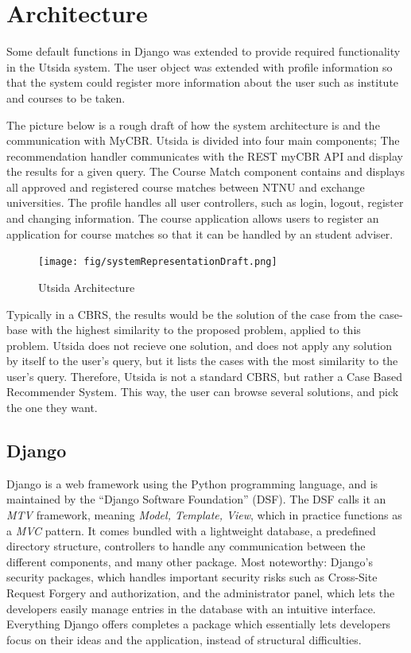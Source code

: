 \section{Architecture}

Some default functions in Django was extended to provide required functionality in the Utsida system. The user object was extended with profile information so that the system could register more information about the user such as institute and courses to be taken. 

The picture below is a rough draft of how the system architecture is and the communication with MyCBR. Utsida is divided into four main components; The recommendation handler communicates with the REST myCBR API and display the results for a given query. The Course Match component contains and displays all approved and registered course matches between NTNU and exchange universities. The profile handles all user controllers, such as login, logout, register and changing information. The course application allows users to register an application for course matches so that it can be handled by an student adviser. 

\begin{figure}[H]
    \centering
    \texttt{[image: fig/systemRepresentationDraft.png]}
    \caption{Utsida Architecture}
    \label{fig:utsida}
\end{figure}

Typically in a CBRS, the results would be the solution of the case from the case-base with the highest similarity to the proposed problem, applied to this problem. Utsida does not recieve one solution, and does not apply any solution by itself to the user's query, but it lists the cases with the most similarity to the user's query. Therefore, Utsida is not a standard CBRS, but rather a Case Based Recommender System. This way, the user can browse several solutions, and pick the one they want.

\subsection{Django}
Django\cite{djangodocs} is a web framework using the Python programming language, and is maintained by the \enquote{Django Software Foundation} (DSF). The DSF calls it an \emph{MTV} framework, meaning \emph{Model, Template, View}, which in practice functions as a \emph{MVC} pattern. It comes bundled with a lightweight database, a predefined directory structure, controllers to handle any communication between the different components, and many other package. Most noteworthy: Django's security packages, which handles important security risks such as Cross-Site Request Forgery and authorization, and the administrator panel, which lets the developers easily manage entries in the database with an intuitive interface. Everything Django offers completes a package which essentially lets developers focus on their ideas and the application, instead of structural difficulties. 

